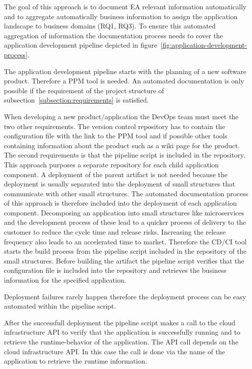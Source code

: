 The goal of this approach is to document EA relevant information automatically and to aggregate automatically business information to assign the application landscape to business domains (RQ1, RQ3). To ensure this automated aggregation of information the documentation process needs to cover the application development pipeline depicted in figure~\ref{fig:application-development-process}.

The application development pipeline starts with the planning of a new software product. Therefore a PPM tool is needed. An automated documentation is only possible if the requirement of the project structure of subsection~\ref{subsection:requirements} is satisfied. 

When developing a new product/application the DevOps team must meet the two other requirements. The version control repository has to contain the configuration file with the link to the PPM tool and if possible other tools containing information about the product such as a wiki page for the product. The second requirements is that the pipeline script is included in the repository. 
This approach purposes a separate repository for each child application component. 
A deployment of the parent artifact is not needed because the deployment is usually separated into the deployment of small structures that communicate with other small structures. The automated documentation process of this approach is therefore included into the deployment of each application component. \cite{Bogner2016}
Decomposing an application into small structures like microservices and the development process of these lead to a quicker process of delivery to the customer to reduce the cycle time and release risks. \cite{Chen2017} Increasing the release frequency also leads to an accelerated time to market. \cite{Chen2017}\cite{Chen2015b} Therefore the CD/CI tool starts the build process from the pipeline script included in the repository of the small structures.
Before building the artifact the pipeline script verifies that the configuration file is included into the repository and retrieves the business information for the specified application.

Deployment failures rarely happen therefore the deployment process can be easy automated within the pipeline script. \cite{Chen2017}

After the successfull deployment the pipeline script makes a call to the cloud infrastructure API to verify that the application is successfully running and to retrieve the runtime-behavior of the application. The API call depends on the cloud infrastructure API. In this case the call is done via the name of the application to retrieve the runtime information.

